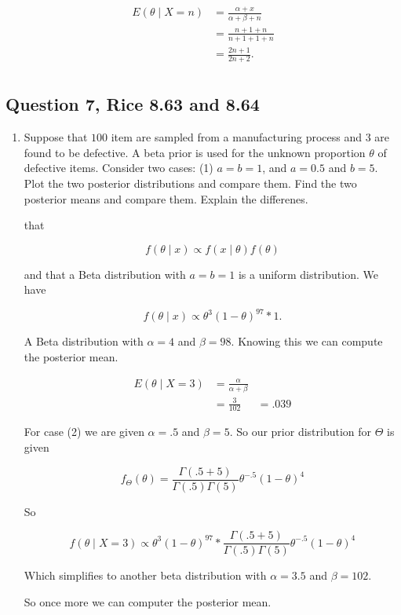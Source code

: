 \documentclass{tufte-book}
\theoremstyle{mytheoremstyle}
\theoremstyle{mylemstyle}
\theoremstyle{mydefstyle}
\begin{document}
\begin{align*}
E(\theta \mid X=n) &= \frac{\alpha + x}{\alpha + \beta + n}\\
&= \frac{n+1 + n}{n + 1 + 1 +n}\\
&= \frac{2n+1}{2n+2}.\\
\end{align*}


\subsection{Question 7, Rice 8.63 and 8.64}

\begin{enumerate}

\item Suppose that $100$ item are sampled from a manufacturing process and $3$ are found to be defective.  A beta prior is used for the unknown proportion $\theta$ of defective items.  Consider two cases: (1) $a=b=1$, and $a=0.5$ and $b=5$.  Plot the two posterior distributions and compare them.  Find the two posterior means and compare them.  Explain the differenes.

 that

\[f(\theta \mid x) \propto f(x \mid \theta) f(\theta) \]

and that a Beta distribution with $a=b=1$ is a uniform distribution.  We have

\[f(\theta \mid x) \propto \theta^{3}(1-\theta)^{97} * 1. \]

A Beta distribution with $\alpha=4$ and $\beta=98$.  Knowing this we can compute the posterior mean.

\begin{align*}
E(\theta \mid X=3) &= \frac{\alpha}{\alpha + \beta}\\
&= \frac{3}{102}
&= .039
\end{align*}

For case (2) we are given $\alpha=.5$ and $\beta=5$.  So our prior distribution for $\Theta$ is given

\[ f_\Theta(\theta) = \frac{\Gamma(.5+5)}{\Gamma(.5)\Gamma(5)} \theta^{-.5} (1-\theta)^4 \]

So

\[ f(\theta \mid X=3) \propto \theta^3 (1-\theta)^{97} * \frac{\Gamma(.5+5)}{\Gamma(.5)\Gamma(5)} \theta^{-.5} (1-\theta)^4 \]

Which simplifies to another beta distribution with $\alpha=3.5$ and $\beta=102$.

So once more we can computer the posterior mean.


\end{enumerate}
\end{document}
